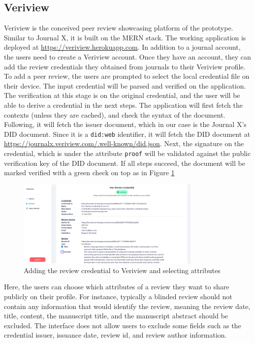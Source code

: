 \subsection{Veriview}

Veriview is the conceived peer review showcasing platform of the prototype. Similar to Journal X, it is built on the \acrshort{MERN} stack. The working application is deployed at \url{https://veriview.herokuapp.com}. In addition to a journal account, the users need to create a Veriview account. Once they have an account, they can add the review credentials they obtained from journals to their Veriview profile. To add a peer review, the users are prompted to select the local credential file on their device. The input credential will be parsed and verified on the application. The verification at this stage is on the original credential, and the user will be able to derive a credential in the next steps. The application will first fetch the contexts (unless they are cached), and check the syntax of the document. Following, it will fetch the issuer document, which in our case is the Journal X's \acrshort{DID} document. Since it is a \lstinline{did:web} identifier, it will fetch the \acrshort{DID} document at \url{https://journalx.veriview.com/.well-known/did.json}. Next, the signature on the credential, which is under the attribute \lstinline{proof} will be validated against the public verification key of the \acrshort{DID} document. If all steps succeed, the document will be marked verified with a green check on top as in Figure \ref{fig:select-attributes}

\begin{figure}[htpb]
  \centering
  \includegraphics[width=0.8\textwidth]{figures/select-attributes.png}
  \caption{Adding the review credential to Veriview and selecting attributes} \label{fig:select-attributes}
\end{figure}

Here, the users can choose which attributes of a review they want to share publicly on their profile. For instance, typically a blinded review should not contain any information that would identify the review, meaning the review date, title, content, the manuscript title, and the manuscript abstract should be excluded. The interface does not allow users to exclude some fields such as the credential issuer, issuance date, review id, and review author information.

